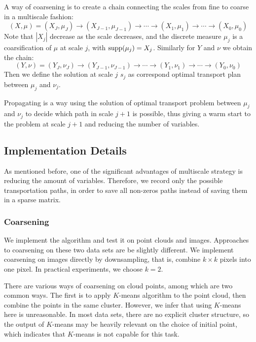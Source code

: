 \documentclass[english]{pkupaper}
\begin{document}
A way of coarsening is to create a chain connecting the scales from fine to coarse in a multiscale fashion:
\begin{equation}
(X, \mu) = (X_J, \mu_J)\rightarrow(X_{J-1},\mu_{J-1})\rightarrow\cdots\rightarrow(X_1,\mu_1)\rightarrow\cdots\rightarrow(X_0,\mu_0)
\end{equation}
Note that $|X_j|$ decrease  as the scale decreases, and the discrete measure $\mu_j$ is a coarsification of $\mu$ at scale $j$, with $\operatorname{\mathrm{supp}}(\mu_j) = X_j$. Similarly for $Y$ and $\nu$ we obtain the chain:
\begin{equation}
(Y, \nu) = (Y_J, \nu_J)\rightarrow(Y_{J-1},\nu_{J-1})\rightarrow\cdots\rightarrow(Y_1,\nu_1)\rightarrow\cdots\rightarrow(Y_0,\nu_0)
\end{equation}
Then we define the solution at scale $j$ $s_j$ as correspond optimal transport plan between $\mu_j$ and $\nu_j$.

Propagating is a way using the solution of optimal transport problem between $\mu_j$ and $\nu_j$ to decide which path in scale $j+1$ is possible, thus giving a warm start to the problem at scale $j+1$ and reducing the number of variables.

\subsection{Implementation Details}

As mentioned before, one of the significant advantages of multiscale strategy is reducing the amount of variables. Therefore, we record only the possible transportation paths, in order to save all non-zeros paths instead of saving them in a sparse matrix.

\subsubsection{Coarsening}

We implement the algorithm and test it on point clouds and images. Approaches to coarsening on these two data sets are be slightly different. We implement coarsening on images directly by downsampling, that is, combine $k\times k$ pixels into one pixel. In practical experiments, we choose $k =2$.

There are various ways of coarsening on cloud points, among which are two common ways. The first is to apply $K$-means algorithm to the point cloud, then combine the points in the same cluster. However, we infer that using $K$-means here is unreasonable. In most data sets, there are no explicit cluster structure, so the output of $K$-means may be heavily relevant on the choice of initial point, which indicates that $K$-means is not capable for this task.
\end{document}
